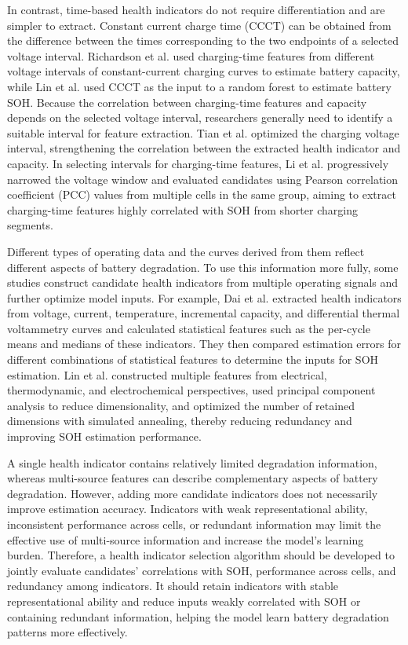 In contrast, time-based health indicators do not require differentiation and are simpler to extract. Constant current charge time (CCCT) can be obtained from the difference between the times corresponding to the two endpoints of a selected voltage interval. Richardson et al.\cite{ref28} used charging-time features from different voltage intervals of constant-current charging curves to estimate battery capacity, while Lin et al.\cite{ref63} used CCCT as the input to a random forest to estimate battery SOH. Because the correlation between charging-time features and capacity depends on the selected voltage interval, researchers generally need to identify a suitable interval for feature extraction. Tian et al.\cite{ref51} optimized the charging voltage interval, strengthening the correlation between the extracted health indicator and capacity. In selecting intervals for charging-time features, Li et al.\cite{ref31} progressively narrowed the voltage window and evaluated candidates using Pearson correlation coefficient (PCC) values from multiple cells in the same group, aiming to extract charging-time features highly correlated with SOH from shorter charging segments.

Different types of operating data and the curves derived from them reflect different aspects of battery degradation. To use this information more fully, some studies construct candidate health indicators from multiple operating signals and further optimize model inputs. For example, Dai et al.\cite{ref48} extracted health indicators from voltage, current, temperature, incremental capacity, and differential thermal voltammetry curves and calculated statistical features such as the per-cycle means and medians of these indicators. They then compared estimation errors for different combinations of statistical features to determine the inputs for SOH estimation. Lin et al.\cite{ref55} constructed multiple features from electrical, thermodynamic, and electrochemical perspectives, used principal component analysis to reduce dimensionality, and optimized the number of retained dimensions with simulated annealing, thereby reducing redundancy and improving SOH estimation performance.

A single health indicator contains relatively limited degradation information, whereas multi-source features can describe complementary aspects of battery degradation. However, adding more candidate indicators does not necessarily improve estimation accuracy. Indicators with weak representational ability, inconsistent performance across cells, or redundant information may limit the effective use of multi-source information and increase the model's learning burden. Therefore, a health indicator selection algorithm should be developed to jointly evaluate candidates' correlations with SOH, performance across cells, and redundancy among indicators. It should retain indicators with stable representational ability and reduce inputs weakly correlated with SOH or containing redundant information, helping the model learn battery degradation patterns more effectively.

